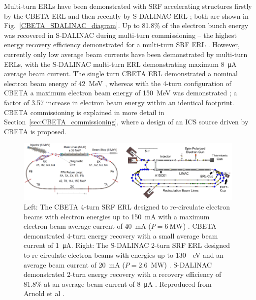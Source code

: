 \documentclass[../main.tex]{subfiles}
\begin{document}
Multi-turn ERLs have been demonstrated with SRF accelerating structures firstly by the CBETA ERL \cite{bartnik2020cbeta} and then recently by S-DALINAC ERL \cite{arnold2020first,adolphsen2022european}; both are shown in Fig.~\ref{CBETA_SDALINAC_diagram}. Up to 81.8\% of the electron bunch energy was recovered in S-DALINAC during multi-turn commissioning -- the highest energy recovery efficiency demonstrated for a multi-turn SRF ERL \cite{adolphsen2022european}. However, currently only low average beam currents have been demonstrated by multi-turn ERLs, with the S-DALINAC multi-turn ERL demonstrating maximum 8~\si{\micro\ampere} average beam current. The single turn CBETA ERL demonstrated a nominal electron beam energy of 42~\si{\mega\electronvolt} \cite{gulliford2021measurement}, whereas with the 4-turn configuration of CBETA a maximum electron beam energy of 150~\si{\mega\electronvolt} was demonstrated \cite{bartnik2020cbeta}; a factor of 3.57 increase in electron beam energy within an identical footprint. CBETA commissioning is explained in more detail in Section~\ref{sec:CBETA_commissioning}, where a design of an ICS source driven by CBETA is proposed.
\begin{figure}[!h]
\centering
\includegraphics[width=\textwidth]{Figures/Introduction/CBETA_SDALINAC_diagram.pdf}
\caption{Left: The CBETA 4-turn SRF ERL designed to re-circulate electron beams with electron energies up to 150~\si{\milli\ampere} with a maximum electron beam average current of 40~\si{\milli\ampere} ($P = 6~\si{\mega\watt}$) \cite{hoffstaetter2017cbeta}. CBETA demonstrated 4-turn energy recovery with a small average beam current of 1~\si{\micro\ampere}. Right: The S-DALINAC 2-turn SRF ERL designed to re-circulate electron beams with energies up to 130~\si{\meg\electronvolt} and an average beam current of 20~\si{\milli\ampere} ($P = 2.6$~\si{\mega\watt}) \cite{arnold2017erl}. S-DALINAC demonstrated 2-turn energy recovery with a recovery efficiency of 81.8\% at an average beam current of 8~\si{\micro\ampere} \cite{adolphsen2022european}. Reproduced from Arnold et al \cite{arnold2020first}.}
\label{fig:CBETA_SDALINAC_diagram}
\end{figure}
\end{document}
